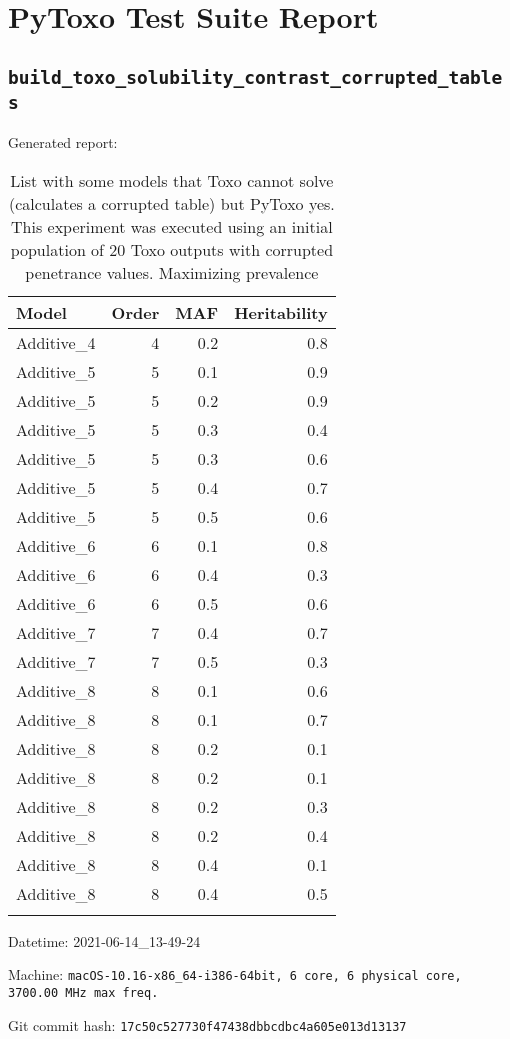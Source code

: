 \documentclass{article}
\begin{document}
\section*{PyToxo Test Suite Report}
\subsection*{\texttt{build\_toxo\_solubility\_contrast\_corrupted\_tables}}
Generated report:

\begin{longtable}[H]{lrrr}
\hline
 Model      &   Order &   MAF &   Heritability \\
\hline
 Additive\_4 &       4 &   0.2 &            0.8 \\
 Additive\_5 &       5 &   0.1 &            0.9 \\
 Additive\_5 &       5 &   0.2 &            0.9 \\
 Additive\_5 &       5 &   0.3 &            0.4 \\
 Additive\_5 &       5 &   0.3 &            0.6 \\
 Additive\_5 &       5 &   0.4 &            0.7 \\
 Additive\_5 &       5 &   0.5 &            0.6 \\
 Additive\_6 &       6 &   0.1 &            0.8 \\
 Additive\_6 &       6 &   0.4 &            0.3 \\
 Additive\_6 &       6 &   0.5 &            0.6 \\
 Additive\_7 &       7 &   0.4 &            0.7 \\
 Additive\_7 &       7 &   0.5 &            0.3 \\
 Additive\_8 &       8 &   0.1 &            0.6 \\
 Additive\_8 &       8 &   0.1 &            0.7 \\
 Additive\_8 &       8 &   0.2 &            0.1 \\
 Additive\_8 &       8 &   0.2 &            0.1 \\
 Additive\_8 &       8 &   0.2 &            0.3 \\
 Additive\_8 &       8 &   0.2 &            0.4 \\
 Additive\_8 &       8 &   0.4 &            0.1 \\
 Additive\_8 &       8 &   0.4 &            0.5 \\
\hline

\caption{List with some models that Toxo cannot solve (calculates a corrupted table) but PyToxo yes. This experiment was executed using an initial population of 20 Toxo outputs with corrupted penetrance values. Maximizing prevalence}
\end{longtable}
Datetime: 2021-06-14\_13-49-24

Machine: \texttt{macOS-10.16-x86\_64-i386-64bit, 6 core, 6 physical core, 3700.00 MHz max freq.}

Git commit hash: \texttt{17c50c527730f47438dbbcdbc4a605e013d13137}
\end{document}
